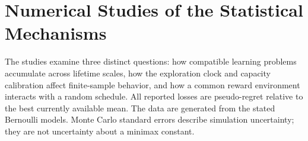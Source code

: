 \section{Numerical Studies of the Statistical Mechanisms}\label{sec:experiments}
The studies examine three distinct questions: how compatible learning
problems accumulate across lifetime scales, how the exploration clock
and capacity calibration affect finite-sample behavior, and how a
common reward environment interacts with a random schedule. All
reported losses are pseudo-regret relative to the best currently
available mean. The data are generated from the stated Bernoulli
models. Monte Carlo standard errors describe simulation uncertainty;
they are not uncertainty about a minimax constant.


\ifdefined\JASASubmission\FloatBarrier\fi

\ifdefined\JASASubmission\FloatBarrier\fi

\ifdefined\JASASubmission\FloatBarrier\fi

\ifdefined\JASASubmission\FloatBarrier\fi
